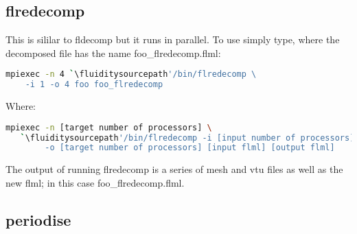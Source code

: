 \subsection{flredecomp}
\label{mesh!meshing tools!flredecomp}
This is sililar to fldecomp but it runs in parallel. To use simply type, where the decomposed file has the name foo\_flredecomp.flml:

\begin{lstlisting}[language=bash]
mpiexec -n 4 `\fluiditysourcepath'/bin/flredecomp \
    -i 1 -o 4 foo foo_flredecomp
\end{lstlisting}

Where:

\begin{lstlisting}[language=bash]
mpiexec -n [target number of processors] \
   `\fluiditysourcepath'/bin/flredecomp -i [input number of processors] \
        -o [target number of processors] [input flml] [output flml]
\end{lstlisting}

The output of running flredecomp is a series of mesh and vtu files as well as the new flml; in this case foo\_flredecomp.flml.

\subsection{periodise}






